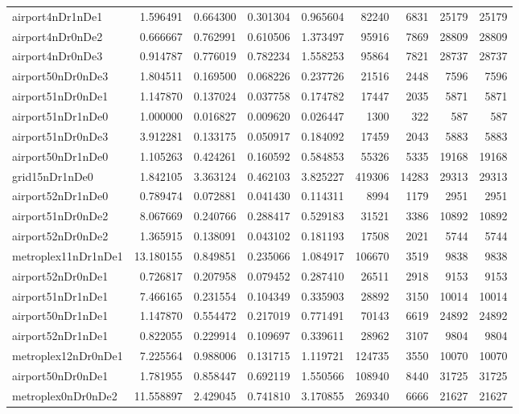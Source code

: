 \documentclass[../../../thesis.tex]{subfiles}
\begin{document}
\begin{longtable}{|l|r|r|r|r|r|r|r|r|}
airport4nDr1nDe1 & 1.596491 & 0.664300 & 0.301304 & 0.965604 & 82240 & 6831 & 25179 & 25179 \\
airport4nDr0nDe2 & 0.666667 & 0.762991 & 0.610506 & 1.373497 & 95916 & 7869 & 28809 & 28809 \\
airport4nDr0nDe3 & 0.914787 & 0.776019 & 0.782234 & 1.558253 & 95864 & 7821 & 28737 & 28737 \\
airport50nDr0nDe3 & 1.804511 & 0.169500 & 0.068226 & 0.237726 & 21516 & 2448 & 7596 & 7596 \\
airport51nDr0nDe1 & 1.147870 & 0.137024 & 0.037758 & 0.174782 & 17447 & 2035 & 5871 & 5871 \\
airport51nDr1nDe0 & 1.000000 & 0.016827 & 0.009620 & 0.026447 & 1300 & 322 & 587 & 587 \\
airport51nDr0nDe3 & 3.912281 & 0.133175 & 0.050917 & 0.184092 & 17459 & 2043 & 5883 & 5883 \\
airport50nDr1nDe0 & 1.105263 & 0.424261 & 0.160592 & 0.584853 & 55326 & 5335 & 19168 & 19168 \\
grid15nDr1nDe0 & 1.842105 & 3.363124 & 0.462103 & 3.825227 & 419306 & 14283 & 29313 & 29313 \\
airport52nDr1nDe0 & 0.789474 & 0.072881 & 0.041430 & 0.114311 & 8994 & 1179 & 2951 & 2951 \\
airport51nDr0nDe2 & 8.067669 & 0.240766 & 0.288417 & 0.529183 & 31521 & 3386 & 10892 & 10892 \\
airport52nDr0nDe2 & 1.365915 & 0.138091 & 0.043102 & 0.181193 & 17508 & 2021 & 5744 & 5744 \\
metroplex11nDr1nDe1 & 13.180155 & 0.849851 & 0.235066 & 1.084917 & 106670 & 3519 & 9838 & 9838 \\
airport52nDr0nDe1 & 0.726817 & 0.207958 & 0.079452 & 0.287410 & 26511 & 2918 & 9153 & 9153 \\
airport51nDr1nDe1 & 7.466165 & 0.231554 & 0.104349 & 0.335903 & 28892 & 3150 & 10014 & 10014 \\
airport50nDr1nDe1 & 1.147870 & 0.554472 & 0.217019 & 0.771491 & 70143 & 6619 & 24892 & 24892 \\
airport52nDr1nDe1 & 0.822055 & 0.229914 & 0.109697 & 0.339611 & 28962 & 3107 & 9804 & 9804 \\
metroplex12nDr0nDe1 & 7.225564 & 0.988006 & 0.131715 & 1.119721 & 124735 & 3550 & 10070 & 10070 \\
airport50nDr0nDe1 & 1.781955 & 0.858447 & 0.692119 & 1.550566 & 108940 & 8440 & 31725 & 31725 \\
metroplex0nDr0nDe2 & 11.558897 & 2.429045 & 0.741810 & 3.170855 & 269340 & 6666 & 21627 & 21627 \\

\end{longtable}
\end{document}
